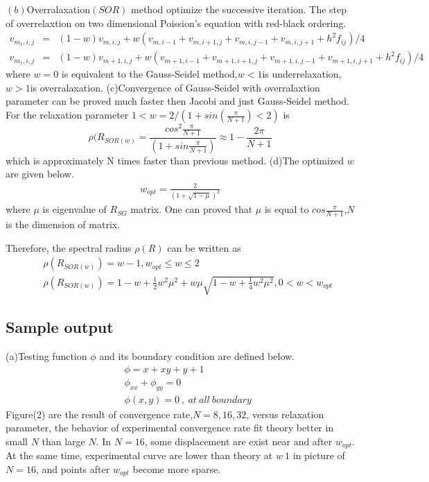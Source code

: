\documentclass[12pt]{article}
\begin{document}
$(b)$Overralaxation$(SOR)$ method optimize the successive iteration. The step of overrelaxtion on two dimensional Poission's equation with red-black ordering.
\begin{eqnarray}
v_{m_1,i,j}&=&(1-w)v_{m,i,j}+ w(v_{m,i-1}+v_{m,i+1,j}+v_{m,i,j-1}+v_{m,i,j+1}+h^2f_{ij})/4\\
v_{m_1,i,j}&=&(1-w)v_{m+1,i,j}+w(v_{m+1,i-1}+v_{m+1,i+1,j}+v_{m+1,i,j-1}+v_{m+1,i,j+1}+h^2f_{ij})/4
\end{eqnarray}
where $w=0$ is equivalent to the Gauss-Seidel method,$w<1$is underrelaxation, $w>1$is overralaxation.
(c)Convergence of Gauss-Seidel with overralaxtion parameter can be proved much faster then Jacobi and just Gauss-Seidel method. For the relaxation parameter $1<w=2/(1+sin(\frac{\pi}{N+1})<2)$ is
\begin{equation}
	\rho(R_{SOR(w)}=\frac{cos^2\frac{\pi}{N+1}}{(1+sin\frac{\pi}{N+1})}\approx1-\frac{2\pi}{N+1}
\end{equation}
which is approximately N times faster than previous method.
(d)The optimized $w$ are given below.
\begin{eqnarray}
	w_{opt}=\frac{2}{(1+\sqrt{1-\mu})^2}
\end{eqnarray}
where $\mu$ is eigenvalue of $R_{SG}$ matrix. One can proved that $\mu$ is equal to ${cos\frac{\pi}{N+1}}$,$N$ is the dimension of matrix.

Therefore, the spectral radius $\rho(R)$ can be written as
\begin{eqnarray}
&&\rho(R_{SOR(w)})= w-1, w_{opt}\leq w \leq 2\nonumber\\
&&\rho(R_{SOR(w)})= 1-w+\frac{1}{2}w^2\mu^2+w\mu\sqrt{1-w+\frac{1}{4}w^2\mu^2}, 0< w < w_{opt}\nonumber
\end{eqnarray}

\subsection{Sample output}
(a)Testing function $\phi$ and its boundary condition are defined below.
\begin{eqnarray}
&&\phi=x+xy+y+1\nonumber\\
&&\phi_{xx}+\phi_{yy}=0\nonumber\\
&&\phi(x,y)=0\ ,\ at\ all\ boundary
\end{eqnarray}
Figure(2) are the result of convergence rate,$N=8,16,32$, versus relaxation parameter, the behavior of experimental convergence rate fit theory better in small $N$ than large $N$. In $N=16$, some displacement are exist near and after $w_{opt}$. At the same time, experimental curve are lower than theory at $w~1$ in picture of $N=16$, and points after $w_{opt}$ become more sparse. 
\end{document}
